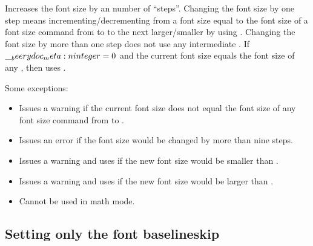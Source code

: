 \documentclass{beerydoc}
\begin{document}
\begin{codedoc}{\stepfontsize}
  \begin{syntax}
     
  \end{syntax}
  Increases the font size by an  number of \enquote{steps}.
  Changing the font size by one step means incrementing\slash decrementing from
  a font size equal to the font size of a font size command from  to
   to the next larger\slash smaller  by
  using .
  Changing the font size by more than one step does not use any intermediate
  .
  If $\__beerydoc_meta:n {integer}=\num{0}$ and the current font size equals the font size of
  any , then  uses
  .

  Some exceptions:
  \begin{itemize}
    \item
    Issues a warning if the current font size does not equal the font size of
    any font size command from  to .
    \item
    Issues an error if the font size would be changed by more than nine steps.
    \item
    Issues a warning and uses  if the new font size would be smaller
    than .
    \item
    Issues a warning and uses  if the new font size would be larger
    than .
    \item Cannot be used in math mode.
  \end{itemize}

  \begin{codedemo}
    \begingroup
      \printfontsizecommand

      \printfontsizecommand

      \printfontsizecommand

      \printfontsizecommand

      \printfontsizecommand
    \endgroup
  \end{codedemo}
\end{codedoc}

\subsection{Setting only the font baselineskip}
\label{subsec:fontbaselineskip}
\end{document}
